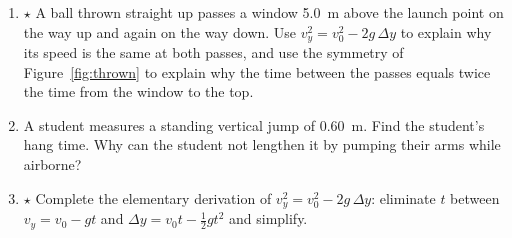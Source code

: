 \documentclass[11pt,twoside,openany]{book}
\begin{document}
\begin{enumerate}[label=\textbf{\thechapter.\arabic*},resume=exercises,leftmargin=*]
  \item $\star$ A ball thrown straight up passes a window \SI{5.0}{\metre} above the launch point on the way up and again on the way down. Use $v_y^2 = v_0^2 - 2g\,\Delta y$ to explain why its speed is the same at both passes, and use the symmetry of Figure~\ref{fig:thrown} to explain why the time between the passes equals twice the time from the window to the top.
  \item A student measures a standing vertical jump of \SI{0.60}{\metre}. Find the student's hang time. Why can the student not lengthen it by pumping their arms while airborne?
  \item $\star$ Complete the elementary derivation of $v_y^2 = v_0^2 - 2g\,\Delta y$: eliminate $t$ between $v_y = v_0 - gt$ and $\Delta y = v_0 t - \tfrac12 g t^2$ and simplify.\label{ex:elimt}
\end{enumerate}
\end{document}
